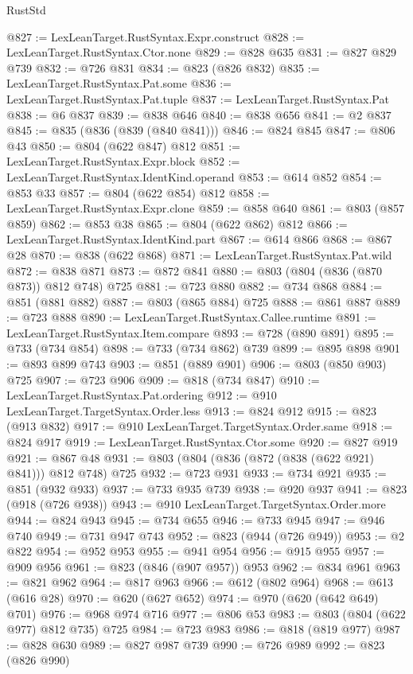 \begin{lexlean}{RustStd}
\begin{coremodule}
@827 := LexLeanTarget.RustSyntax.Expr.construct
@828 := LexLeanTarget.RustSyntax.Ctor.none
@829 := @828 @635
@831 := @827 @829 @739
@832 := @726 @831
@834 := @823 (@826 @832)
@835 := LexLeanTarget.RustSyntax.Pat.some
@836 := LexLeanTarget.RustSyntax.Pat.tuple
@837 := LexLeanTarget.RustSyntax.Pat
@838 := @6 @837
@839 := @838 @646
@840 := @838 @656
@841 := @2 @837
@845 := @835 (@836 (@839 (@840 @841)))
@846 := @824 @845
@847 := @806 @43
@850 := @804 (@622 @847) @812
@851 := LexLeanTarget.RustSyntax.Expr.block
@852 := LexLeanTarget.RustSyntax.IdentKind.operand
@853 := @614 @852
@854 := @853 @33
@857 := @804 (@622 @854) @812
@858 := LexLeanTarget.RustSyntax.Expr.clone
@859 := @858 @640
@861 := @803 (@857 @859)
@862 := @853 @38
@865 := @804 (@622 @862) @812
@866 := LexLeanTarget.RustSyntax.IdentKind.part
@867 := @614 @866
@868 := @867 @28
@870 := @838 (@622 @868)
@871 := LexLeanTarget.RustSyntax.Pat.wild
@872 := @838 @871
@873 := @872 @841
@880 := @803 (@804 (@836 (@870 @873)) @812 @748) @725
@881 := @723 @880
@882 := @734 @868
@884 := @851 (@881 @882)
@887 := @803 (@865 @884) @725
@888 := @861 @887
@889 := @723 @888
@890 := LexLeanTarget.RustSyntax.Callee.runtime
@891 := LexLeanTarget.RustSyntax.Item.compare
@893 := @728 (@890 @891)
@895 := @733 (@734 @854)
@898 := @733 (@734 @862) @739
@899 := @895 @898
@901 := @893 @899 @743
@903 := @851 (@889 @901)
@906 := @803 (@850 @903) @725
@907 := @723 @906
@909 := @818 (@734 @847)
@910 := LexLeanTarget.RustSyntax.Pat.ordering
@912 := @910 LexLeanTarget.TargetSyntax.Order.less
@913 := @824 @912
@915 := @823 (@913 @832)
@917 := @910 LexLeanTarget.TargetSyntax.Order.same
@918 := @824 @917
@919 := LexLeanTarget.RustSyntax.Ctor.some
@920 := @827 @919
@921 := @867 @48
@931 := @803 (@804 (@836 (@872 (@838 (@622 @921) @841))) @812 @748) @725
@932 := @723 @931
@933 := @734 @921
@935 := @851 (@932 @933)
@937 := @733 @935 @739
@938 := @920 @937
@941 := @823 (@918 (@726 @938))
@943 := @910 LexLeanTarget.TargetSyntax.Order.more
@944 := @824 @943
@945 := @734 @655
@946 := @733 @945
@947 := @946 @740
@949 := @731 @947 @743
@952 := @823 (@944 (@726 @949))
@953 := @2 @822
@954 := @952 @953
@955 := @941 @954
@956 := @915 @955
@957 := @909 @956
@961 := @823 (@846 (@907 @957)) @953
@962 := @834 @961
@963 := @821 @962
@964 := @817 @963
@966 := @612 (@802 @964)
@968 := @613 (@616 @28)
@970 := @620 (@627 @652)
@974 := @970 (@620 (@642 @649) @701)
@976 := @968 @974 @716
@977 := @806 @53
@983 := @803 (@804 (@622 @977) @812 @735) @725
@984 := @723 @983
@986 := @818 (@819 @977)
@987 := @828 @630
@989 := @827 @987 @739
@990 := @726 @989
@992 := @823 (@826 @990)

\end{coremodule}
\end{lexlean}
